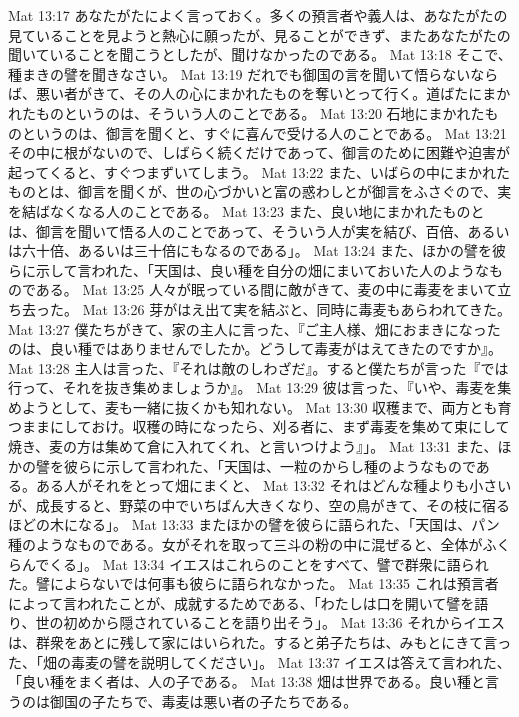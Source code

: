 Mat 13:17  あなたがたによく言っておく。多くの預言者や義人は、あなたがたの見ていることを見ようと熱心に願ったが、見ることができず、またあなたがたの聞いていることを聞こうとしたが、聞けなかったのである。
Mat 13:18  そこで、種まきの譬を聞きなさい。
Mat 13:19  だれでも御国の言を聞いて悟らないならば、悪い者がきて、その人の心にまかれたものを奪いとって行く。道ばたにまかれたものというのは、そういう人のことである。
Mat 13:20  石地にまかれたものというのは、御言を聞くと、すぐに喜んで受ける人のことである。
Mat 13:21  その中に根がないので、しばらく続くだけであって、御言のために困難や迫害が起ってくると、すぐつまずいてしまう。
Mat 13:22  また、いばらの中にまかれたものとは、御言を聞くが、世の心づかいと富の惑わしとが御言をふさぐので、実を結ばなくなる人のことである。
Mat 13:23  また、良い地にまかれたものとは、御言を聞いて悟る人のことであって、そういう人が実を結び、百倍、あるいは六十倍、あるいは三十倍にもなるのである」。
Mat 13:24  また、ほかの譬を彼らに示して言われた、「天国は、良い種を自分の畑にまいておいた人のようなものである。
Mat 13:25  人々が眠っている間に敵がきて、麦の中に毒麦をまいて立ち去った。
Mat 13:26  芽がはえ出て実を結ぶと、同時に毒麦もあらわれてきた。
Mat 13:27  僕たちがきて、家の主人に言った、『ご主人様、畑におまきになったのは、良い種ではありませんでしたか。どうして毒麦がはえてきたのですか』。
Mat 13:28  主人は言った、『それは敵のしわざだ』。すると僕たちが言った『では行って、それを抜き集めましょうか』。
Mat 13:29  彼は言った、『いや、毒麦を集めようとして、麦も一緒に抜くかも知れない。
Mat 13:30  収穫まで、両方とも育つままにしておけ。収穫の時になったら、刈る者に、まず毒麦を集めて束にして焼き、麦の方は集めて倉に入れてくれ、と言いつけよう』」。
Mat 13:31  また、ほかの譬を彼らに示して言われた、「天国は、一粒のからし種のようなものである。ある人がそれをとって畑にまくと、
Mat 13:32  それはどんな種よりも小さいが、成長すると、野菜の中でいちばん大きくなり、空の鳥がきて、その枝に宿るほどの木になる」。
Mat 13:33  またほかの譬を彼らに語られた、「天国は、パン種のようなものである。女がそれを取って三斗の粉の中に混ぜると、全体がふくらんでくる」。
Mat 13:34  イエスはこれらのことをすべて、譬で群衆に語られた。譬によらないでは何事も彼らに語られなかった。
Mat 13:35  これは預言者によって言われたことが、成就するためである、「わたしは口を開いて譬を語り、世の初めから隠されていることを語り出そう」。
Mat 13:36  それからイエスは、群衆をあとに残して家にはいられた。すると弟子たちは、みもとにきて言った、「畑の毒麦の譬を説明してください」。
Mat 13:37  イエスは答えて言われた、「良い種をまく者は、人の子である。
Mat 13:38  畑は世界である。良い種と言うのは御国の子たちで、毒麦は悪い者の子たちである。
